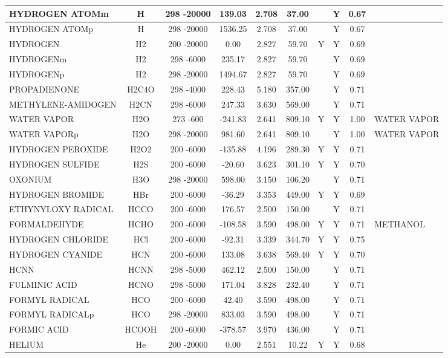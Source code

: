 \begin{longtable}{@{\extracolsep{\fill}}|l|c|c|c|c|c|c|c|c|l|}
HYDROGEN ATOMm&H&298 -20000&  139.03& 2.708&    37.00& &Y& 0.67&\\ \hline
HYDROGEN ATOMp&H&298 -20000& 1536.25& 2.708&    37.00& &Y& 0.67&\\ \hline
HYDROGEN&H2&200 -20000&    0.00& 2.827&    59.70&Y&Y& 0.69&\\ \hline
HYDROGENm&H2&298 -6000&  235.17& 2.827&    59.70& &Y& 0.69&\\ \hline
HYDROGENp&H2&298 -20000& 1494.67& 2.827&    59.70& &Y& 0.69&\\ \hline
PROPADIENONE&H2C4O&298 -4000&  228.43& 5.180&   357.00& &Y& 0.71&\\ \hline
METHYLENE-AMIDOGEN&H2CN&298 -6000&  247.33& 3.630&   569.00& &Y& 0.71&\\ \hline
WATER VAPOR&H2O&273 -600& -241.83& 2.641&   809.10&Y&Y& 1.00&WATER VAPOR\\ \hline
WATER VAPORp&H2O&298 -20000&  981.60& 2.641&   809.10& &Y& 1.00&WATER VAPOR\\ \hline
HYDROGEN PEROXIDE&H2O2&200 -6000& -135.88& 4.196&   289.30&Y&Y& 0.71&\\ \hline
HYDROGEN SULFIDE&H2S&200 -6000&  -20.60& 3.623&   301.10&Y&Y& 0.70&\\ \hline
OXONIUM&H3O&298 -20000&  598.00& 3.150&   106.20& &Y& 0.71&\\ \hline
HYDROGEN BROMIDE&HBr&200 -6000&  -36.29& 3.353&   449.00&Y&Y& 0.69&\\ \hline
ETHYNYLOXY RADICAL&HCCO&200 -6000&  176.57& 2.500&   150.00& &Y& 0.71&\\ \hline
FORMALDEHYDE&HCHO&200 -6000& -108.58& 3.590&   498.00&Y&Y& 0.71&METHANOL\\ \hline
HYDROGEN CHLORIDE&HCl&200 -6000&  -92.31& 3.339&   344.70&Y&Y& 0.75&\\ \hline
HYDROGEN CYANIDE&HCN&200 -6000&  133.08& 3.638&   569.40&Y&Y& 0.70&\\ \hline
HCNN&HCNN&298 -5000&  462.12& 2.500&   150.00& &Y& 0.71&\\ \hline
FULMINIC ACID&HCNO&298 -5000&  171.04& 3.828&   232.40& &Y& 0.71&\\ \hline
FORMYL RADICAL&HCO&200 -6000&   42.40& 3.590&   498.00& &Y& 0.71&\\ \hline
FORMYL RADICALp&HCO&298 -20000&  833.03& 3.590&   498.00& &Y& 0.71&\\ \hline
FORMIC ACID&HCOOH&200 -6000& -378.57& 3.970&   436.00& &Y& 0.71&\\ \hline
HELIUM&He&200 -20000&    0.00& 2.551&    10.22&Y&Y& 0.68&\\ \hline

\end{longtable}

